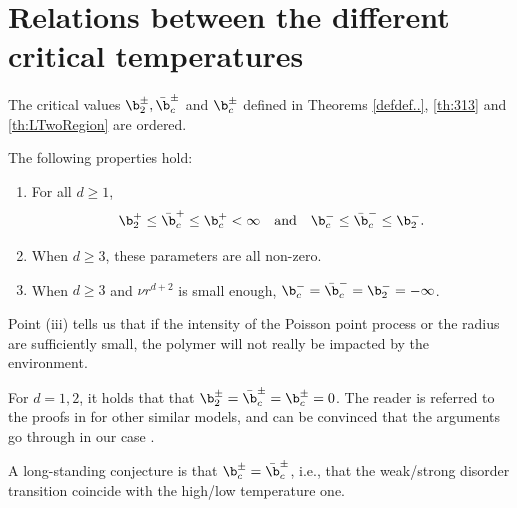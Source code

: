 \section{Relations between the different critical temperatures}

The critical values $\b_2^\pm, {\bar{\b}_c}^\pm$ and $  \b_c^\pm$ defined in Theorems \ref{defdef..}, \ref{th:313} and
\ref{th:LTwoRegion}
are ordered. 

\begin{proposition} The following properties hold:
\begin{enumerate}[label=(\roman*)]
\item For all $d\geq 1$,
\begin{equation}
\b_2^+ \leq {\bar{\b}_c}^+ \leq \b_c^+ < \infty \quad \text{and} \quad \b_c^- \leq {\bar{\b}_c}^- \leq \b_2^-.
\end{equation}
\item When $d\geq 3$, these parameters are all non-zero.
\item When $d\geq 3$ and $\nu r^{d+2}$ is small enough, $\b_c^- = {\bar{\b}_c}^- = \b_2^- = -\infty$.
\end{enumerate} 
\end{proposition}
\begin{remark} Point (iii) tells us that if the intensity of the Poisson point process or the radius are sufficiently small, the polymer will not really be impacted by the environment.
\end{remark}
\begin{remark}\label{rk:criticd=12}
For $d=1,2$, it holds that
that $\b_2^\pm = {\bar{\b}_c}^\pm = \b_c^\pm = 0$. The reader is referred to the proofs in \cite{BeLa15, Bertin, CY05, Lacoin10} for other similar models, and can be convinced that the arguments go through in our case \cite{BertinUnp}.
\end{remark}
\begin{remark}
A long-standing conjecture  is that $\b_c^\pm = {\bar{\b}_c}^\pm$, i.e., that the weak/strong disorder transition coincide with the high/low temperature one. %
\end{remark}



